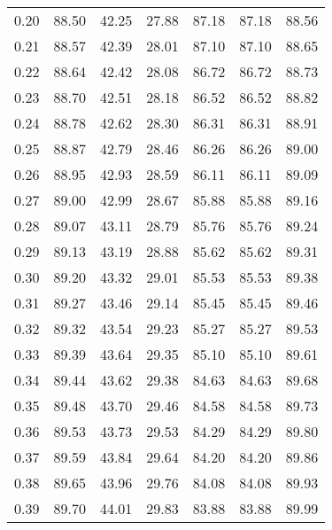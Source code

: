 \begin{tabular}{|c|c|c|c|c|c|c|}
      0.20 &     88.50 &     42.25 &      27.88 &   87.18 &      87.18 &         88.56 \\
      0.21 &     88.57 &     42.39 &      28.01 &   87.10 &      87.10 &         88.65 \\
      0.22 &     88.64 &     42.42 &      28.08 &   86.72 &      86.72 &         88.73 \\
      0.23 &     88.70 &     42.51 &      28.18 &   86.52 &      86.52 &         88.82 \\
      0.24 &     88.78 &     42.62 &      28.30 &   86.31 &      86.31 &         88.91 \\
      0.25 &     88.87 &     42.79 &      28.46 &   86.26 &      86.26 &         89.00 \\
      0.26 &     88.95 &     42.93 &      28.59 &   86.11 &      86.11 &         89.09 \\
      0.27 &     89.00 &     42.99 &      28.67 &   85.88 &      85.88 &         89.16 \\
      0.28 &     89.07 &     43.11 &      28.79 &   85.76 &      85.76 &         89.24 \\
      0.29 &     89.13 &     43.19 &      28.88 &   85.62 &      85.62 &         89.31 \\
      0.30 &     89.20 &     43.32 &      29.01 &   85.53 &      85.53 &         89.38 \\
      0.31 &     89.27 &     43.46 &      29.14 &   85.45 &      85.45 &         89.46 \\
      0.32 &     89.32 &     43.54 &      29.23 &   85.27 &      85.27 &         89.53 \\
      0.33 &     89.39 &     43.64 &      29.35 &   85.10 &      85.10 &         89.61 \\
      0.34 &     89.44 &     43.62 &      29.38 &   84.63 &      84.63 &         89.68 \\
      0.35 &     89.48 &     43.70 &      29.46 &   84.58 &      84.58 &         89.73 \\
      0.36 &     89.53 &     43.73 &      29.53 &   84.29 &      84.29 &         89.80 \\
      0.37 &     89.59 &     43.84 &      29.64 &   84.20 &      84.20 &         89.86 \\
      0.38 &     89.65 &     43.96 &      29.76 &   84.08 &      84.08 &         89.93 \\
      0.39 &     89.70 &     44.01 &      29.83 &   83.88 &      83.88 &         89.99 \\

\end{tabular}
